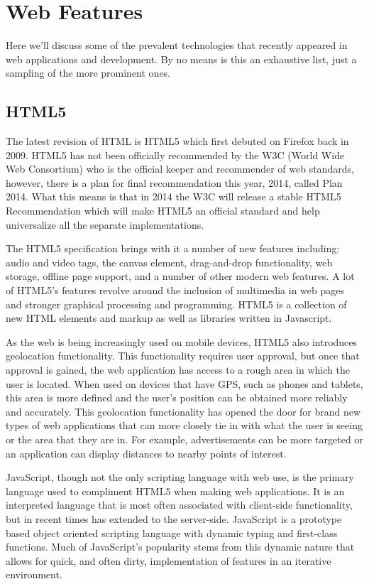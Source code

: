 \documentclass[12pt]{ucthesis}
\begin{document}
\section{Web Features}
Here we'll discuss some of the prevalent technologies that recently appeared in web applications and development. By no means is this an exhaustive list, just a sampling of the more prominent ones.

\subsection{HTML5}
The latest revision of HTML is HTML5 which first debuted on Firefox back in 2009. \cite{EvolutionOfWeb} HTML5 has not been officially recommended by the W3C (World Wide Web Consortium) who is the official keeper and recommender of web standards, however, there is a plan for final recommendation this year, 2014, called Plan 2014. \cite{Plan2014} What this means is that in 2014 the W3C will release a stable HTML5 Recommendation which will make HTML5 an official standard and help universalize all the separate implementations.

The HTML5 specification brings with it a number of new features including: audio and video tags, the canvas element, drag-and-drop functionality, web storage, offline page support, and a number of other modern web features. A lot of HTML5's features revolve around the inclusion of multimedia in web pages and stronger graphical processing and programming. HTML5 is a collection of new HTML elements and markup as well as libraries written in Javascript.

As the web is being increasingly used on mobile devices, HTML5 also introduces geolocation functionality. This functionality requires user approval, but once that approval is gained, the web application has access to a rough area in which the user is located. When used on devices that have GPS, such as phones and tablets, this area is more defined and the user's position can be obtained more reliably and accurately. This geolocation functionality has opened the door for brand new types of web applications that can more closely tie in with what the user is seeing or the area that they are in. For example, advertisements can be more targeted or an application can display distances to nearby points of interest.

JavaScript, though not the only scripting language with web use, is the primary language used to compliment HTML5 when making web applications. It is an interpreted language that is most often associated with client-side functionality, but in recent times has extended to the server-side. JavaScript is a prototype based object oriented scripting language with dynamic typing and first-class functions. Much of JavaScript's popularity stems from this dynamic nature that allows for quick, and often dirty, implementation of features in an iterative environment.
\end{document}
